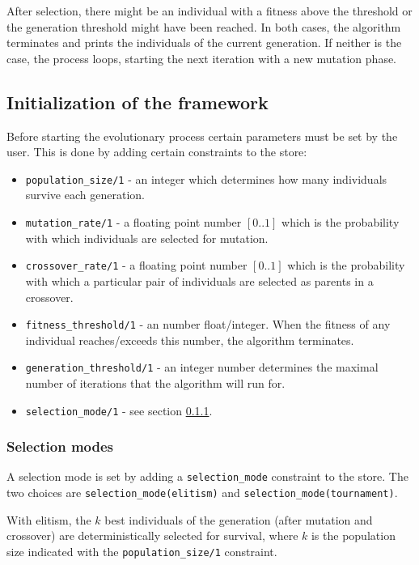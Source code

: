 \documentclass{article}
\begin{document}
After selection, there might be an individual with a fitness above the threshold or the generation threshold might have been reached. In both cases, the algorithm terminates and prints the individuals of the current generation. If neither is the case, the process loops, starting the next iteration with a new mutation phase.

\subsection{Initialization of the framework}
\label{sec:initialization}

Before starting the evolutionary process certain parameters must be set by the user. This is done by adding certain constraints to the store:
\begin{itemize}
\item \verb|population_size/1| - an integer which determines how many individuals survive each generation. 
\item \verb|mutation_rate/1| - a floating point number $[0..1]$ which is the probability with which individuals are selected for mutation.
\item \verb|crossover_rate/1| - a floating point number $[0..1]$ which is the probability with which a particular pair of individuals are selected as parents in a crossover.
\item \verb|fitness_threshold/1| - an number float/integer. When the fitness of any individual reaches/exceeds this number, the algorithm terminates.
\item \verb|generation_threshold/1| - an integer number determines the maximal number of iterations that the algorithm will run for. 
\item \verb|selection_mode/1| - see section \ref{sec:selection_modes}.
\end{itemize}

\subsubsection{Selection modes}
\label{sec:selection_modes}

A selection mode is set by adding a \verb|selection_mode| constraint to the store. The two choices are \verb|selection_mode(elitism)| and \verb|selection_mode(tournament)|. 

With elitism, the $k$ best individuals of the generation (after mutation and crossover) are deterministically selected for survival, where $k$ is the population size indicated with the \verb|population_size/1| constraint. 
\end{document}
